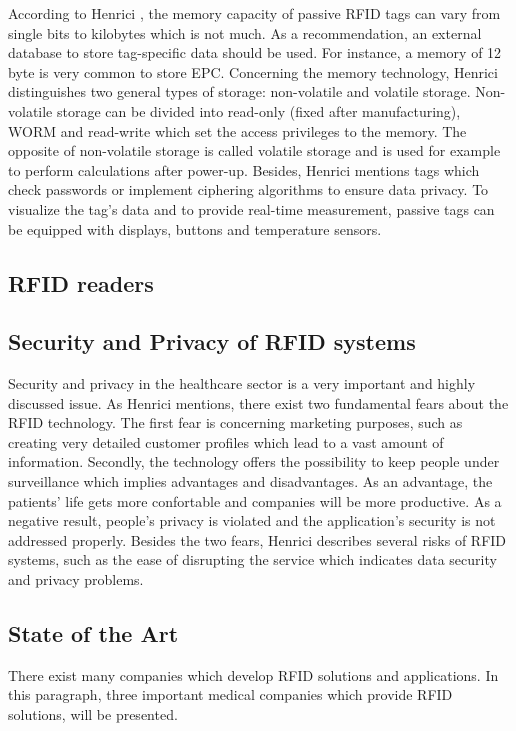 According to Henrici \cite{henrici}, the memory capacity of passive RFID tags can vary from single bits to kilobytes which is not much. As a recommendation, an external database to store tag-specific data should be used. For instance, a memory of 12 byte is very common to store \ac{EPC}. Concerning the memory technology, Henrici distinguishes two general types of storage: non-volatile and volatile storage. Non-volatile storage can be divided into read-only (fixed after manufacturing), \ac{WORM} and read-write which set the access privileges to the memory. The opposite of non-volatile storage is called volatile storage and is used for example to perform calculations after power-up. Besides, Henrici mentions tags which check passwords or implement ciphering algorithms to ensure data privacy. To visualize the tag's data and to provide real-time measurement, passive tags can be equipped with displays, buttons and temperature sensors. 

\subsection{RFID readers}

\subsection{Security and Privacy of RFID systems}

Security and privacy in the healthcare sector is a very important and highly discussed issue. As Henrici \cite{henrici} mentions, there exist two fundamental fears about the RFID technology. The first fear is concerning marketing purposes, such as creating very detailed customer profiles which lead to a vast amount of information. Secondly, the technology offers the possibility to keep people under surveillance which implies advantages and disadvantages. As an advantage, the patients' life gets more confortable and companies will be more productive. As a negative result, people's privacy is violated and the application's security is not addressed properly.
Besides the two fears, Henrici describes several risks of RFID systems, such as the ease of disrupting the service which indicates data security and privacy problems.

\subsection{State of the Art}

There exist many companies which develop \ac{RFID} solutions and applications. In this paragraph, three important medical companies which provide RFID solutions, will be presented.

